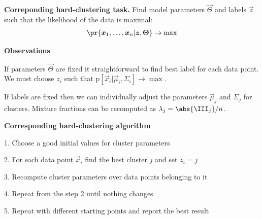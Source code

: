 \documentclass[landscape,footrule]{foils}
\newcommand{\pd}[1]{\mathrm{p}[#1]}
\begin{document}
\vspace*{1cm}


\textbf{Correponding hard-clustering task.} Find model parameters $\vec{\Theta}$ and labels $\vec{z}$ such that the likelihood of the data is maximal:
\begin{align*}
\pr{\vec{x}_1,\ldots,\vec{x}_n|\vec{z},\vec{\Theta}}\to \max
\end{align*}



\textbf{Observations} 
\begin{triangles}
\item If parameters $\vec{\Theta}$ are fixed it straightforward to find best label for each data point. We must choose $z_i$ such that $\pd{\vec{x}_i|\vec{\mu}_i,\Sigma_i}\to \max$.
\item If labels are fixed then we can individually adjust the parameters $\vec{\mu}_j$ and $\Sigma_j$ for clusters. Mixture fractions can be recomputed as $\lambda_j=\abs{\III_j}/n$.
\end{triangles}

\vspace*{0.5cm}


\textbf{Corresponding hard-clustering algorithm}
\begin{triangles}
\item[1.] Choose a good initial values for cluster parameters
\item[2.] For each data point $\vec{x}_i$ find the best cluster $j$ and set $z_i=j$
\item[3.] Recompute cluster parameters over data points belonging to it
\item[4.] Repeat from the step 2 until nothing changes
\item[5.] Repeat with different starting points and report the best result   
\end{triangles}
\vspace*{-0.5cm}


\end{document}
